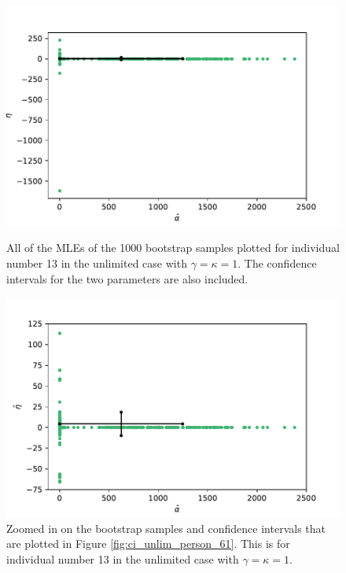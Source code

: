 \begin{figure}
    \centering
    \begin{minipage}{0.48\textwidth}
        \centering
        \includegraphics[scale=0.36]{pictures/ci_unlim_person13_pdf.pdf}
        \caption[MLEs of bootstrap samples individual 13, unlimited]{All of the MLEs of the 1000 bootstrap samples plotted for individual number 13 in the unlimited case with $\gamma=\kappa=1$. The confidence intervals for the two parameters are also included.}
        \label{fig:ci_unlim_person_13}
    \end{minipage}\hfill
    \begin{minipage}{0.48\textwidth}
        \centering
        \includegraphics[scale=0.36]{pictures/ci_unlim_person13_zoomed_pdf.pdf}
        \caption[MLEs of bootstrap samples individual 13, unlimited, zoomed]{Zoomed in on the bootstrap samples and confidence intervals that are plotted in Figure \ref{fig:ci_unlim_person_61}. This is for individual number 13 in the unlimited case with $\gamma=\kappa=1$.}
        \label{fig:ci_unlim_person_13_zoomed}
    \end{minipage}
\end{figure}
 


